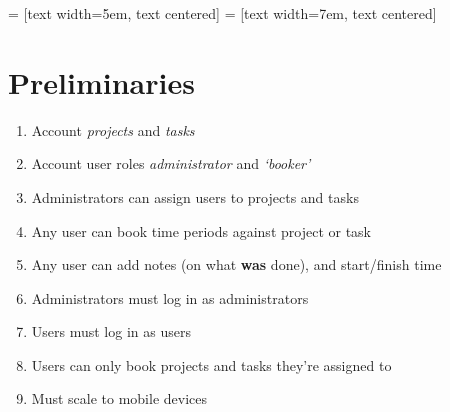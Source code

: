 \documentclass[10pt, english, aspectratio=169]{beamer}
\begin{document}
	 = [text width=5em, text centered]
         = [text width=7em, text centered]
	
	{\scriptsize{}}

\newpage

\section{Preliminaries}

	\begin{enumerate}
	\setlength\itemsep{0cm}
		\item Account \textit{projects} and \textit{tasks}
		\item Account user roles \textit{administrator} and \textit{`booker'}
		\item Administrators can assign users to projects and tasks
		\item Any user can book time periods against project or task
		\item Any user can add notes (on what \textbf{was} done), and start/finish time
		\item Administrators must log in as administrators
		\item Users must log in as users
		\item Users can only book projects and tasks they're assigned to
		\item Must scale to mobile devices
	\end{enumerate}
\end{document}
